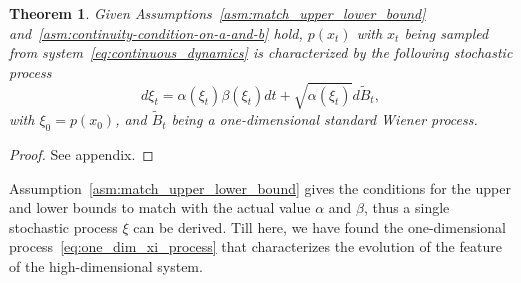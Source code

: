 \documentclass[letterpaper]{article} %
\newtheorem{theorem}{Theorem}
\begin{document}
\begin{theorem}
\label{thm:comparison_lemma}
Given Assumptions~\ref{asm:match_upper_lower_bound} and~\ref{asm:continuity-condition-on-a-and-b} hold, $p(x_t)$ with $x_t$ being sampled from system~\eqref{eq:continuous_dynamics} is characterized by the following stochastic process
\begin{equation}
\label{eq:one_dim_xi_process}
    d \xi_t = \alpha\left(\xi_t\right) \beta\left(\xi_t\right) d t + \sqrt{\alpha\left(\xi_t\right)} d \tilde{B}_t,
\end{equation}
with $\xi_0 = p(x_0)$, and $\tilde{B}_t$ being a one-dimensional standard Wiener process.
\end{theorem}
\begin{proof}
    See appendix.
\end{proof}
Assumption~\ref{asm:match_upper_lower_bound} gives the conditions for the upper and lower bounds to match with the actual value $\alpha$ and $\beta$, thus a single stochastic process $\xi$ can be derived.
Till here, we have found the one-dimensional process~\eqref{eq:one_dim_xi_process} that characterizes the evolution of the feature of the high-dimensional system.
\end{document}
